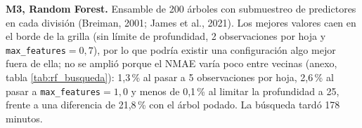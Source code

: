 \textbf{M3, Random Forest.} Ensamble de 200 árboles con submuestreo de predictores en cada división (Breiman, 2001; James et al., 2021). Los mejores valores caen en el borde de la grilla (sin límite de profundidad, 2 observaciones por hoja y \texttt{max\_features}$=0{,}7$), por lo que podría existir una configuración algo mejor fuera de ella; no se amplió porque el NMAE varía poco entre vecinas (anexo, tabla \ref{tab:rf_busqueda}): 1,3\,\% al pasar a 5 observaciones por hoja, 2,6\,\% al pasar a \texttt{max\_features}$=1{,}0$ y menos de 0,1\,\% al limitar la profundidad a 25, frente a una diferencia de 21,8\,\% con el árbol podado. La búsqueda tardó 178 minutos.


